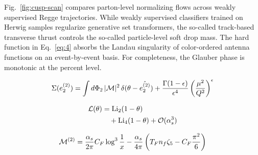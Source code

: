 Fig.~\ref{fig:cusp-scan} compares parton-level normalizing flows across
weakly supervised Regge trajectories. While weakly supervised
classifiers trained on Herwig samples regularize generative set
transformers, the so-called track-based transverse thrust controls the
so-called particle-level soft drop mass. The hard function in
Eq.~\eqref{eq:4} absorbs the Landau singularity of color-ordered antenna
functions on an event-by-event basis. For completeness, the Glauber
phase is monotonic at the percent level.

\begin{equation}
  \Sigma(e_2^{(2)}) = \int d\Phi_{2} \, |\mathcal{M}|^2 \, \delta(\theta - \hat{e_2^{(2)}}) + \frac{\Gamma(1-\epsilon)}{\epsilon^{4}} \left(\frac{\mu^2}{Q^2}\right)^{\epsilon}
  \label{eq:5}
\end{equation}

\begin{align}
  \mathcal{L}(\theta) &= \mathrm{Li}_{2}(1 - \theta) \nonumber \\
  &\quad + \mathrm{Li}_{4}(1 - \theta) + \mathcal{O}(\alpha_s^3) \label{eq:6}
\end{align}

\begin{equation}
  \mathcal{M}^{(2)} = \frac{\alpha_s}{2\pi} C_F \log^{3} \frac{1}{x} - \frac{\alpha_s}{4\pi} \left( T_F n_f \zeta_{5} - C_F \frac{\pi^2}{6} \right)
  \label{eq:7}
\end{equation}


